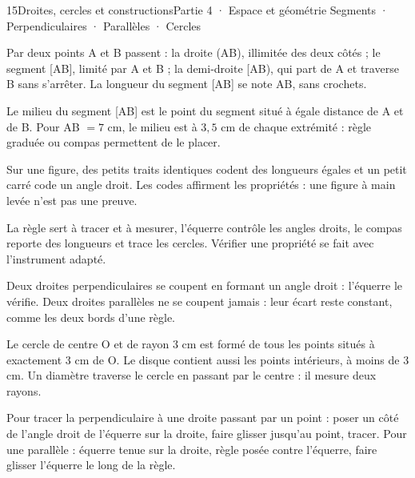 \begin{ouverture}[geometrie]{15}{Droites, cercles et constructions}{Partie 4 · Espace et géométrie}
{Segments · Perpendiculaires · Parallèles · Cercles}
\end{ouverture}
\pagestyle{otMain}\essentiel\fontsize{11}{15}\selectfont
{}\label{cours-15-1}
\begin{definition}Par deux points A et B passent : la droite (AB), illimitée des deux côtés ; le segment [AB], limité par A et B ; la demi-droite [AB), qui part de A et traverse B sans s’arrêter. La longueur du segment [AB] se note AB, sans crochets.\end{definition}
\begin{savoirfaire}Le milieu du segment [AB] est le point du segment situé à égale distance de A et de B. Pour AB $=7$ cm, le milieu est à $3{,}5$ cm de chaque extrémité : règle graduée ou compas permettent de le placer.\end{savoirfaire}
\begin{propriete}Sur une figure, des petits traits identiques codent des longueurs égales et un petit carré code un angle droit. Les codes affirment les propriétés : une figure à main levée n’est pas une preuve.\end{propriete}
\begin{attention}La règle sert à tracer et à mesurer, l’équerre contrôle les angles droits, le compas reporte des longueurs et trace les cercles. Vérifier une propriété se fait avec l’instrument adapté.\end{attention}
\clearpage
{}\label{cours-15-2}
\begin{definition}Deux droites perpendiculaires se coupent en formant un angle droit : l’équerre le vérifie. Deux droites parallèles ne se coupent jamais : leur écart reste constant, comme les deux bords d’une règle.\end{definition}
\label{fig-cours-15-2-cours-cercle}

\begin{definition}Le cercle de centre O et de rayon 3 cm est formé de tous les points situés à exactement 3 cm de O. Le disque contient aussi les points intérieurs, à moins de 3 cm. Un diamètre traverse le cercle en passant par le centre : il mesure deux rayons.\end{definition}
\begin{savoirfaire}Pour tracer la perpendiculaire à une droite passant par un point : poser un côté de l’angle droit de l’équerre sur la droite, faire glisser jusqu’au point, tracer. Pour une parallèle : équerre tenue sur la droite, règle posée contre l’équerre, faire glisser l’équerre le long de la règle.\end{savoirfaire}

